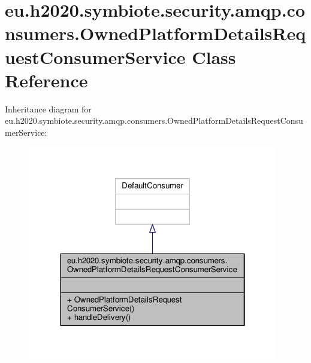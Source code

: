 \hypertarget{classeu_1_1h2020_1_1symbiote_1_1security_1_1amqp_1_1consumers_1_1OwnedPlatformDetailsRequestConsumerService}{}\section{eu.\+h2020.\+symbiote.\+security.\+amqp.\+consumers.\+Owned\+Platform\+Details\+Request\+Consumer\+Service Class Reference}
\label{classeu_1_1h2020_1_1symbiote_1_1security_1_1amqp_1_1consumers_1_1OwnedPlatformDetailsRequestConsumerService}


Inheritance diagram for eu.\+h2020.\+symbiote.\+security.\+amqp.\+consumers.\+Owned\+Platform\+Details\+Request\+Consumer\+Service\+:
\nopagebreak
\begin{figure}[H]
\begin{center}
\leavevmode
\includegraphics[width=310pt]{classeu_1_1h2020_1_1symbiote_1_1security_1_1amqp_1_1consumers_1_1OwnedPlatformDetailsRequestConsumerService__inherit__graph}
\end{center}
\end{figure}


